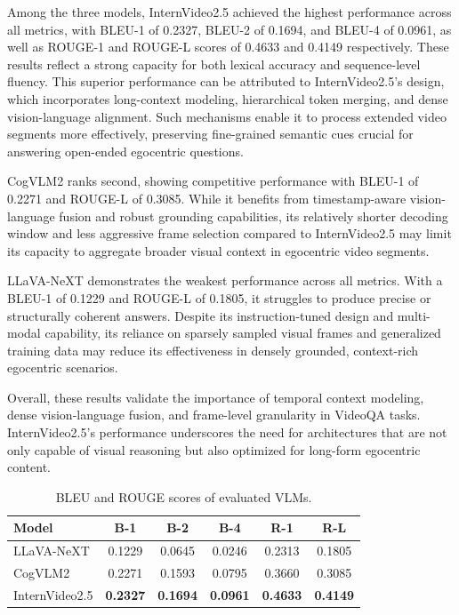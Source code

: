 \documentclass[10pt,twocolumn,letterpaper]{article}
\begin{document}
Among the three models, InternVideo2.5 achieved the highest performance across all metrics, with BLEU-1 of 0.2327, BLEU-2 of 0.1694, and BLEU-4 of 0.0961, as well as ROUGE-1 and ROUGE-L scores of 0.4633 and 0.4149 respectively. These results reflect a strong capacity for both lexical accuracy and sequence-level fluency. This superior performance can be attributed to InternVideo2.5’s design, which incorporates long-context modeling, hierarchical token merging, and dense vision-language alignment. Such mechanisms enable it to process extended video segments more effectively, preserving fine-grained semantic cues crucial for answering open-ended egocentric questions.

CogVLM2 ranks second, showing competitive performance with BLEU-1 of 0.2271 and ROUGE-L of 0.3085. While it benefits from timestamp-aware vision-language fusion and robust grounding capabilities, its relatively shorter decoding window and less aggressive frame selection compared to InternVideo2.5 may limit its capacity to aggregate broader visual context in egocentric video segments.

LLaVA-NeXT demonstrates the weakest performance across all metrics. With a BLEU-1 of 0.1229 and ROUGE-L of 0.1805, it struggles to produce precise or structurally coherent answers. Despite its instruction-tuned design and multi-modal capability, its reliance on sparsely sampled visual frames and generalized training data may reduce its effectiveness in densely grounded, context-rich egocentric scenarios.

Overall, these results validate the importance of temporal context modeling, dense vision-language fusion, and frame-level granularity in VideoQA tasks. InternVideo2.5's performance underscores the need for architectures that are not only capable of visual reasoning but also optimized for long-form egocentric content.

	
	\begin{table}[ht]
		\small  %
		\setlength{\tabcolsep}{4pt}  %
		\centering
		\begin{tabular}{lccccc}
			\toprule
			\textbf{Model} & \textbf{B-1} & \textbf{B-2} & \textbf{B-4} & \textbf{R-1} & \textbf{R-L} \\
			\midrule
			LLaVA-NeXT      & 0.1229 & 0.0645 & 0.0246 & 0.2313 & 0.1805 \\
			CogVLM2         & 0.2271 & 0.1593 & 0.0795 & 0.3660 & 0.3085 \\
			InternVideo2.5  & \textbf{0.2327} & \textbf{0.1694} & \textbf{0.0961} & \textbf{0.4633} & \textbf{0.4149} \\
			\bottomrule
		\end{tabular}
		\caption{BLEU and ROUGE scores of evaluated VLMs.}
		\label{tab:vlms_performance}
	\end{table}
	
\end{document}
